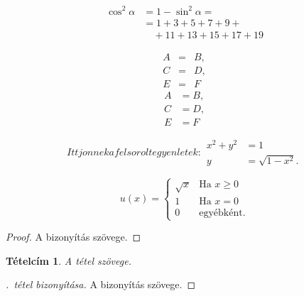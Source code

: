 \documentclass[a4paper]{article}
\newtheorem{tetel}{Tételcím}
\begin{document}
\[
\begin{split}
\cos^2\alpha &=1-
\sin^2\alpha=\\
&=1+3+5+7+9+{}\\
&\quad+11+13+15+17+1
9
\end{split}
\]

\begin{eqnarray*}
A&=&B,\\
C&=&D,\\
E&=&F
\end{eqnarray*}
\begin{align*}
A&=B,\\
C&=D,\\
E&=F
\end{align*}

\begin{subequations}
Itt jonnek a felsorolt egyenletek:
\begin{align}
x^2 + y^2 &= 1\\
y &= \sqrt{1 - x^2}.
\end{align}
\end{subequations}

\[
u(x) =
\begin{cases}
\sqrt{x}& \text{Ha } x \geq 0 \\
1 & \text{Ha } x = 0 \\
0 & \text{egyébként}.
\end{cases}
\]

\begin{proof}
A bizonyítás szövege.
\end{proof}
\begin{tetel}\label{xy}
A tétel szövege.
\end{tetel}
\begin{proof}[.~tétel bizonyítása]
A bizonyítás szövege.
\end{proof}
\end{document}
